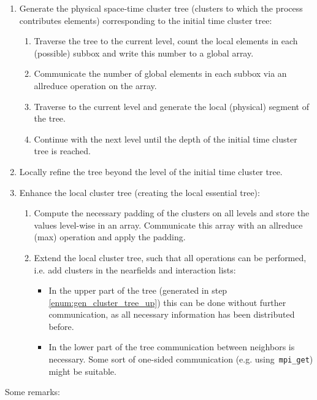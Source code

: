 \documentclass[a4paper,11pt]{article}
\theoremstyle{plain}
\theoremstyle{definition}
\theoremstyle{remark}
\begin{document}
\begin{enumerate}
  \item Generate the physical space-time cluster tree (clusters to which the process contributes elements) 
  corresponding to the initial time cluster tree: \label{enum:gen_cluster_tree_up}
  \begin{enumerate}
    \item Traverse the tree to the current level, count the local elements in each (possible) subbox and write this 
    number to a global array.
    \item Communicate the number of global elements in each subbox via an allreduce operation on the array.
    \item Traverse to the current level and generate the local (physical) segment of the tree.
    \item Continue with the next level until the depth of the initial time cluster tree is reached.
  \end{enumerate}

  \item Locally refine the tree beyond the level of the initial time cluster tree. 
  
  \item Enhance the local cluster tree (creating the local essential tree):
  \begin{enumerate}
    \item Compute the necessary padding of the clusters on all levels and store the values level-wise in an array. 
    Communicate this array with an allreduce (max) operation and apply the padding.
    \item Extend the local cluster tree, such that all operations can be performed, i.e. add clusters in the 
    nearfields and interaction lists:
    \begin{itemize}
      \item In the upper part of the tree (generated in step \ref{enum:gen_cluster_tree_up}) this can be done without 
      further communication, as all necessary information has been distributed before.
      \item In the lower part of the tree communication between neighbors is necessary. Some sort of one-sided 
      communication (e.g. using~\texttt{mpi\_get}) might be suitable. 
    \end{itemize}
  \end{enumerate}
\end{enumerate}
Some remarks: 
\end{document}
